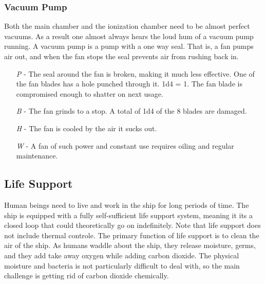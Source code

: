 \documentclass[a4paper]{article}
\begin{document}
\vspace{-0.5cm} \hspace{-18pt} \subsubsection{Vacuum Pump} \label{ray_vacuum_pump} \vspace{-0.2cm}
Both the main chamber and the ionization chamber need to be almost perfect vacuums. As a result one almost always hears the loud hum of a vacuum pump running. A vacuum pump is a pump with a one way seal. That is, a fan pumps air out, and when the fan stops the seal prevents air from rushing back in. 
\begin{enumerate}
\item [\textit{P}] - The seal around the fan is broken, making it much less effective. One of the fan blades has a hole punched through it. \newline \hspace{-3pt} 1d4 = 1. The fan blade is compromised enough to shatter on next usage.
\item [\textit{B}] - The fan grinds to a stop. A total of 1d4 of the 8 blades are damaged.
\item [\textit{H}] - The fan is cooled by the air it sucks out.
\item [\textit{W}] - A fan of such power and constant use requires oiling and regular maintenance.
\end{enumerate}


\subsection{Life Support} \label{life}

Human beings need to live and work in the ship for long periods of time. The ship is equipped with a fully self-sufficient life support system, meaning it its a closed loop that could theoretically go on indefinitely. Note that life support does not include thermal controle. The primary function of life support is to clean the air of the ship. As humans waddle about the ship, they release moisture, germs, and they add take away oxygen while adding carbon dioxide. The physical moisture and bacteria is not particularly difficult to deal with, so the main challenge is getting rid of carbon dioxide chemically.
\end{document}
